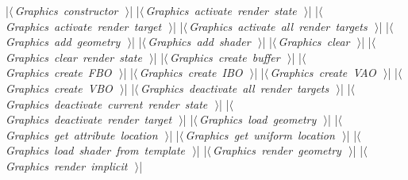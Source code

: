 \documentclass[%
    a4paper,    %
    justified,  %
    nobib,      %
    openany     %
]{tufte-book}
\begin{document}
\begin{fullwidth}
\begin{flushleft}
\begin{minipage}{\linewidth}
\begin{pythoncode}
    |\hbox{$\langle\,${\itshape Graphics constructor}\nobreak\ {\footnotesize {}}$\,\rangle$}|
    |\hbox{$\langle\,${\itshape Graphics activate render state}\nobreak\ {\footnotesize {}}$\,\rangle$}|
    |\hbox{$\langle\,${\itshape Graphics activate render target}\nobreak\ {\footnotesize {}}$\,\rangle$}|
    |\hbox{$\langle\,${\itshape Graphics activate all render targets}\nobreak\ {\footnotesize {}}$\,\rangle$}|
    |\hbox{$\langle\,${\itshape Graphics add geometry}\nobreak\ {\footnotesize {}}$\,\rangle$}|
    |\hbox{$\langle\,${\itshape Graphics add shader}\nobreak\ {\footnotesize {}}$\,\rangle$}|
    |\hbox{$\langle\,${\itshape Graphics clear}\nobreak\ {\footnotesize {}}$\,\rangle$}|
    |\hbox{$\langle\,${\itshape Graphics clear render state}\nobreak\ {\footnotesize {}}$\,\rangle$}|
    |\hbox{$\langle\,${\itshape Graphics create buffer}\nobreak\ {\footnotesize {}}$\,\rangle$}|
    |\hbox{$\langle\,${\itshape Graphics create FBO}\nobreak\ {\footnotesize {}}$\,\rangle$}|
    |\hbox{$\langle\,${\itshape Graphics create IBO}\nobreak\ {\footnotesize {}}$\,\rangle$}|
    |\hbox{$\langle\,${\itshape Graphics create VAO}\nobreak\ {\footnotesize {}}$\,\rangle$}|
    |\hbox{$\langle\,${\itshape Graphics create VBO}\nobreak\ {\footnotesize {}}$\,\rangle$}|
    |\hbox{$\langle\,${\itshape Graphics deactivate all render targets}\nobreak\ {\footnotesize {}}$\,\rangle$}|
    |\hbox{$\langle\,${\itshape Graphics deactivate current render state}\nobreak\ {\footnotesize {}}$\,\rangle$}|
    |\hbox{$\langle\,${\itshape Graphics deactivate render target}\nobreak\ {\footnotesize {}}$\,\rangle$}|
    |\hbox{$\langle\,${\itshape Graphics load geometry}\nobreak\ {\footnotesize {}}$\,\rangle$}|
    |\hbox{$\langle\,${\itshape Graphics get attribute location}\nobreak\ {\footnotesize {}}$\,\rangle$}|
    |\hbox{$\langle\,${\itshape Graphics get uniform location}\nobreak\ {\footnotesize {}}$\,\rangle$}|
    |\hbox{$\langle\,${\itshape Graphics load shader from template}\nobreak\ {\footnotesize {}}$\,\rangle$}|
    |\hbox{$\langle\,${\itshape Graphics render geometry}\nobreak\ {\footnotesize {}}$\,\rangle$}|
    |\hbox{$\langle\,${\itshape Graphics render implicit}\nobreak\ {\footnotesize {}}$\,\rangle$}|

\end{pythoncode}
\end{minipage}
\end{flushleft}
\end{fullwidth}
\end{document}
